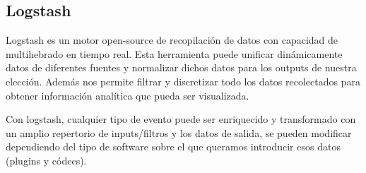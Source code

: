 \subsection{Logstash}
Logstash es un motor open-source de recopilación de datos con capacidad de multihebrado en tiempo real. Esta herramienta puede unificar dinámicamente datos de diferentes fuentes y normalizar dichos datos para los outputs de nuestra elección. Además nos permite filtrar y discretizar todo los datos recolectados para obtener información analítica que pueda ser visualizada.\\


Con logstash, cualquier tipo de evento puede ser enriquecido y transformado con un amplio repertorio de inputs/filtros y los datos de salida, se pueden modificar dependiendo del tipo de software sobre el que queramos introducir esos datos (plugins y códecs).\\

